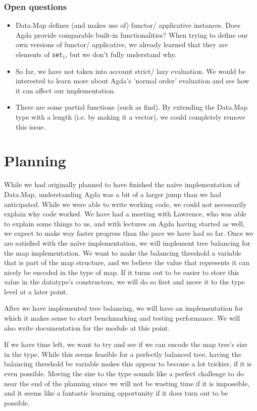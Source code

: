 \documentclass[a4paper,UKenglish,cleveref, autoref, thm-restate]{template/lipics-v2021}
\begin{document}
\subsubsection*{Open questions}
\begin{itemize}
  \item Data.Map defines (and makes use of) functor/ applicative instances. Does Agda provide comparable built-in functionalities? When trying to define our own versions of functor/ applicative, we already learned that they are elements of \texttt{set$_{1}$}, but we don't fully understand why.
  \item So far, we have not taken into account strict/ lazy evaluation. We would be interested to learn more about Agda's 'normal order' evaluation and see how it can affect our implementation.
  \item There are some partial functions (such as find). By extending the Data.Map type with a length (i.e. by making it a vector), we could completely remove this issue.
\end{itemize}



\section*{Planning}

While we had originally planned to have finished the na\"ive implementation of Data.Map, understanding Agda was a bit of a larger jump than we had anticipated. While we were able to write working code, we could not necessarily explain why code worked. We have had a meeting with Lawrence, who was able to explain some things to us, and with lectures on Agda having started as well, we expect to make way faster progress than the pace we have had so far. Once we are satisfied with the na\"ive implementation, we will implement tree balancing for the map implementation. We want to make the balancing threshold a variable that is part of the map structure, and we believe the value that represents it can nicely be encoded in the type of map. If it turns out to be easier to store this value in the datatype's constructors, we will do so first and move it to the type level at a later point.

After we have implemented tree balancing, we will have an implementation for which it makes sense to start benchmarking and testing performance. We will also write documentation for the module at this point.

If we have time left, we want to try and see if we can encode the map tree's size in the type. While this seems feasible for a perfectly balanced tree, having the balancing threshold be variable makes this appear to become a lot trickier, if it is even possible. Moving the size to the type sounds like a perfect challenge to do near the end of the planning since we will not be wasting time if it is impossible, and it seems like a fantastic learning opportunity if it does turn out to be possible.
\end{document}
